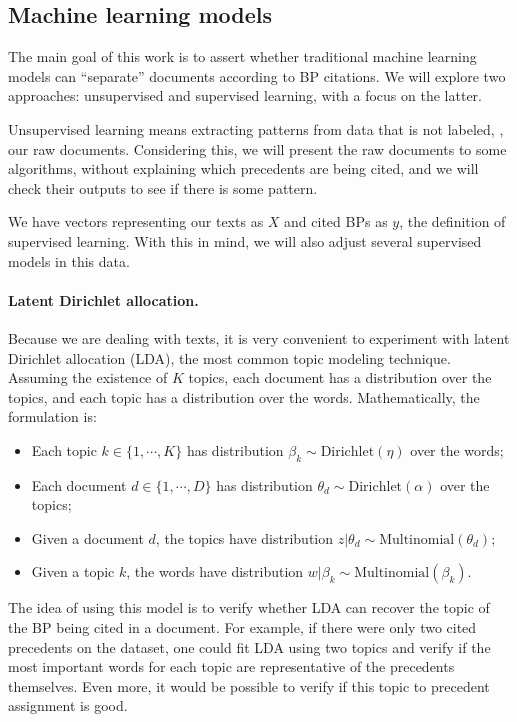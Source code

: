\subsection{Machine learning models}
    \label{sec:models}

    The main goal of this work is to assert whether traditional machine learning models can ``separate'' documents according to BP citations. We will explore two approaches: unsupervised and supervised learning, with a focus on the latter.

    Unsupervised learning means extracting patterns from data that is not labeled, \eg, our raw documents. Considering this, we will present the raw documents to some algorithms, without explaining which precedents are being cited, and we will check their outputs to see if there is some pattern.

    We have vectors representing our texts as $X$ and cited BPs as $y$, the definition of supervised learning. With this in mind, we will also adjust several supervised models in this data.

    \paragraph{Latent Dirichlet allocation.} Because we are dealing with texts, it is very convenient to experiment with latent Dirichlet allocation (LDA), the most common topic modeling technique. Assuming the existence of $K$ topics, each document has a distribution over the topics, and each topic has a distribution over the words. Mathematically, the formulation is:

    \begin{itemize}
            \item Each topic $k \in \{1, \cdots, K\}$ has distribution $\beta_k \sim \text{Dirichlet}(\eta)$ over the words;
            \item Each document $d \in \{1, \cdots, D\}$ has distribution $\theta_d \sim \text{Dirichlet}(\alpha)$ over the topics;
            \item Given a document $d$, the topics have distribution $z | \theta_d \sim \text{Multinomial}(\theta_d)$;
            \item Given a topic $k$, the words have distribution $w | \beta_k \sim \text{Multinomial}(\beta_k)$.
    \end{itemize}

    The idea of using this model is to verify whether LDA can recover the topic of the BP being cited in a document. For example, if there were only two cited precedents on the dataset, one could fit LDA using two topics and verify if the most important words for each topic are representative of the precedents themselves. Even more, it would be possible to verify if this topic to precedent assignment is good.

